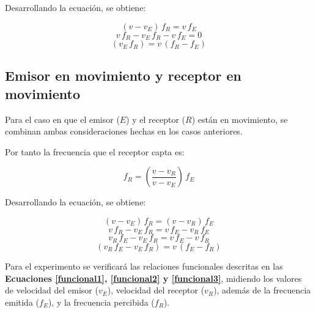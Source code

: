 \documentclass[letter,11pt]{article}
\begin{document}
Desarrollando la ecuación, se obtiene:

\begin{equation*}
    (v - v_E)\,f_R = v\,f_E
\end{equation*}
\begin{equation*}
    v\,f_R - v_E\,f_R - v\,f_E = 0
\end{equation*}
\begin{equation}
    (v_E\,f_R) = v\,(f_R - f_E) 
\label{funcional2}
\end{equation}
\vspace{0.10cm}

\subsection{Emisor en movimiento y receptor en movimiento}

Para el caso en que el emisor ($E$) y el receptor ($R$) están en movimiento, se
combinan ambas consideraciones hechas en los casos anteriores.

Por tanto la frecuencia que el receptor capta es:

\begin{equation}
    f_R = \left(\frac{v - v_R}{v - v_E}\right)\, f_E
\label{doppler}
\end{equation}
\vspace{0.10cm}

Desarrollando la ecuación, se obtiene:

\begin{equation*}
    (v - v_E)\,f_R = (v - v_R)\,f_E
\end{equation*}
\begin{equation*}
    v\,f_R - v_E\,f_R = v\,f_E - v_R\,f_E
\end{equation*}
\begin{equation*}
    v_R\,f_E - v_E\,f_R = v\,f_E - v\,f_R 
\end{equation*}
\begin{equation}
    (v_R\,f_E-v_E\,f_R) = v\,(f_E - f_R)
\label{funcional3}
\end{equation}
\vspace{0.10cm}

Para el experimento se verificará las relaciones funcionales descritas en las
\textbf{Ecuaciones \ref{funcional1}, \ref{funcional2} y \ref{funcional3}},
midiendo los valores de velocidad del emisor ($v_E$), velocidad del receptor
($v_R$), además de la frecuencia emitida ($f_E$), y la frecuencia percibida
($f_R$).
\end{document}
